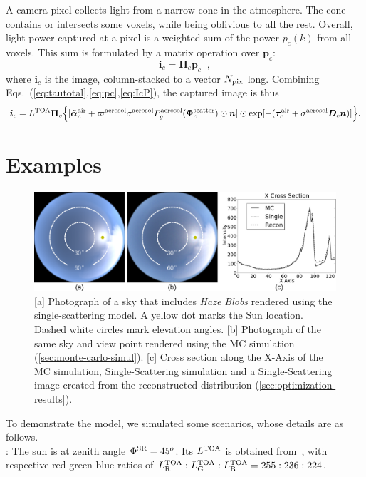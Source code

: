 \documentclass[10pt,letterpaper]{article}
\newcommand{\vect}[1]{\bm{#1}}
\newcommand{\yoavcomment}[1]{}
\renewcommand{\yoavcomment}[1]{#1} %
\begin{document}
A camera pixel collects light from a narrow cone in the
atmosphere. The cone contains or intersects some voxels, while being
oblivious to all the rest.  Overall, light power captured at a pixel
is a weighted sum of the power $p_c(k)$ from all voxels.  This sum is
formulated by a matrix operation over ${\bm p}_c$:
\begin{equation}
  {\bm i}_c= {\vect{\Pi}}_c{\bm p}_c
  \;\;,
  \label{eq:IcP}
\end{equation}
where ${\bm i}_c$ is the image, column-stacked to a vector $N_{\rm
  pix}$ long.  Combining
Eqs.~(\ref{eq:tautotal},\ref{eq:pc},\ref{eq:IcP}), the captured image
is thus
\begin{align}
  {\bm i}_c= L^{\rm TOA} {\vect{\Pi}}_c \Big\{
  [\tilde{\vect{\alpha}}^{\rm air}_c + \varpi^{\rm aerosol}\sigma^{\rm
    aerosol} P^{\rm aerosol}_g(\vect{\Phi}^{\rm scatter}_c) \odot{\bm
    n} ] \odot \exp[-(\vect{\tau}_c^{\rm air} + {\sigma}^{\rm aerosol}
  {\bm D}_c{\bm n})] \Big\} .
  \label{eq:bigIA}
\end{align}


\section{Examples}
\label{sec:simul}

\begin{figure}
  \centering
  \yoavcomment{\includegraphics[width=\linewidth]{images/ref_images.pdf}}
  \caption{\small [a] Photograph of a sky that includes {\em Haze
      Blobs} rendered using the single-scattering model.  A yellow dot
    marks the Sun location. Dashed white circles mark elevation
    angles.  [b] Photograph of the same sky and view point rendered
    using the MC simulation (\cref{sec:monte-carlo-simul}).  [c] Cross
    section along the X-Axis of the MC simulation, Single-Scattering
    simulation and a Single-Scattering image created from the
    reconstructed distribution (\cref{sec:optimization-results}).}
  \label{fig:simulation-results1}
\end{figure}
To demonstrate the model, we simulated some scenarios, whose details are as follows.\\
: The sun is at zenith angle $\Phi^{\rm
  SR}=45^o$.  Its $L^{\rm TOA}$ is obtained
from~\cite{BBradiance,sun_composition}, with respective red-green-blue
ratios of $L^{\rm TOA}_{\rm R}:L^{\rm TOA}_{\rm G}:L^{\rm TOA}_{\rm
  B}=255:236:224$.
\end{document}
